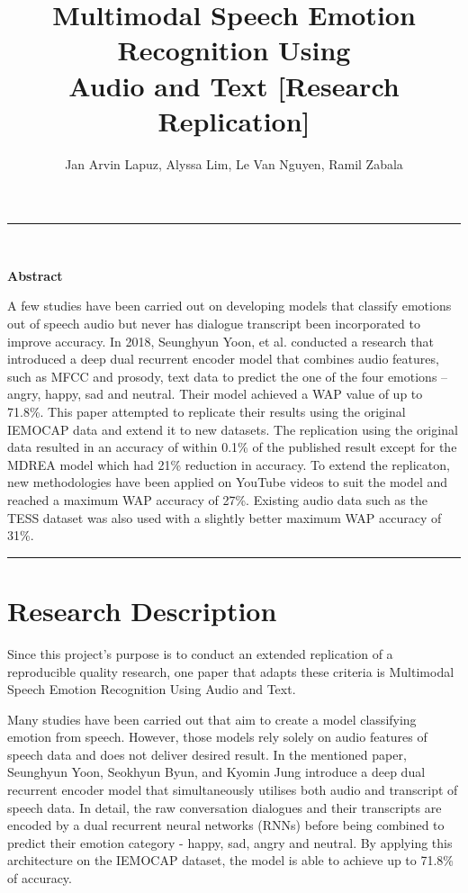 \documentclass{article}
\title{\textbf{%
       Multimodal Speech Emotion Recognition Using\\ 
       Audio and Text [Research Replication]}}
\author{Jan Arvin Lapuz, Alyssa Lim, Le Van Nguyen, Ramil Zabala}
\date{}
\begin{document}
\maketitle

\noindent\rule{16.5cm}{0.4pt}\\
    \begin{center} \textbf{\large Abstract} \end{center}
    \par
    A few studies have been carried out on developing models that classify emotions out of speech audio but never has dialogue transcript been incorporated to improve accuracy. In 2018, Seunghyun Yoon, et al. conducted a research that introduced a deep dual recurrent encoder model that combines audio features, such as MFCC and prosody, text data to predict the one of the four emotions – angry, happy, sad and neutral. Their model achieved a WAP value of up to 71.8\%. This paper attempted to replicate their results using the original IEMOCAP data and extend it to new datasets. The replication using the original data resulted in an accuracy of within 0.1\% of the published result except for the MDREA model which had 21\% reduction in accuracy. To extend the replicaton, new methodologies have been applied on YouTube videos to suit the model and reached a maximum WAP accuracy of 27\%. Existing audio data such as the TESS dataset was also used with a slightly better maximum WAP accuracy of 31\%.\par 
\noindent\rule{16.5cm}{0.4pt}

\section{Research Description}
    Since this project's purpose is to conduct an extended replication of a reproducible quality research, one paper that adapts these criteria is Multimodal Speech Emotion Recognition Using Audio and Text\cite{yoon2018multimodal}.\par
    
    Many studies have been carried out that aim to create a model classifying emotion from speech. However, those models rely solely on audio features of speech data and does not deliver desired result. In the mentioned paper, Seunghyun Yoon, Seokhyun Byun, and Kyomin Jung introduce a deep dual recurrent encoder model that simultaneously utilises both audio and transcript of speech data. In detail, the raw conversation dialogues and their transcripts are encoded by a dual recurrent neural networks (RNNs) before being combined to predict their emotion category -  happy, sad, angry and neutral. By applying this architecture on the IEMOCAP dataset, the model is able to achieve up to 71.8\% of accuracy.\par
\end{document}

